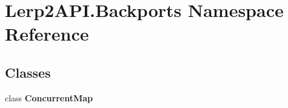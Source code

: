 \hypertarget{namespace_lerp2_a_p_i_1_1_backports}{}\section{Lerp2\+A\+P\+I.\+Backports Namespace Reference}
\label{namespace_lerp2_a_p_i_1_1_backports}
\subsection*{Classes}
\begin{DoxyCompactItemize}
\item 
class {\bfseries Concurrent\+Map}
\end{DoxyCompactItemize}
